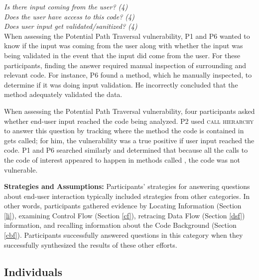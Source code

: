 \documentclass[10pt,journal,compsoc]{IEEEtran}
\begin{document}
\noindent\emph{Is there input coming from the user? (4)} \\
\emph{Does the user have access to this code? (4)} \\
\emph{Does user input get validated/sanitized? (4)} 
\\

 
When assessing the Potential Path Traversal vulnerability, P1 and P6 wanted to know if the input was coming from the user along with whether the input was being validated in the event that the input did come from the user.
For these participants, finding the answer required manual inspection of surrounding and relevant code. 
For instance, P6 found a  method, which he manually inspected, to determine if it was doing input validation.
He incorrectly concluded that the  method adequately validated the data.

When assessing the Potential Path Traversal vulnerability, four participants asked whether end-user input reached the code being analyzed.
P2 used \textsc{call hierarchy} to answer this question by tracking where the method the code is contained in gets called; for him, the vulnerability was a true positive if user input reached the code.
P1 and P6 searched similarly and determined that because all the calls to the code of interest appeared to happen in methods called , the code was not vulnerable.


\textbf{Strategies and Assumptions:}
Participants' strategies for answering questions about end-user interaction typically included strategies from other categories. In other words, participants gathered evidence by Locating Information (Section \ref{li}), examining Control Flow (Section \ref{cf}), retracing Data Flow (Section \ref{dsf}) information, and recalling information about the Code Background (Section \ref{cbf}). 
Participants successfully answered questions in this category when they successfully synthesized the results of these other efforts.





\subsection{Individuals}
\end{document}
